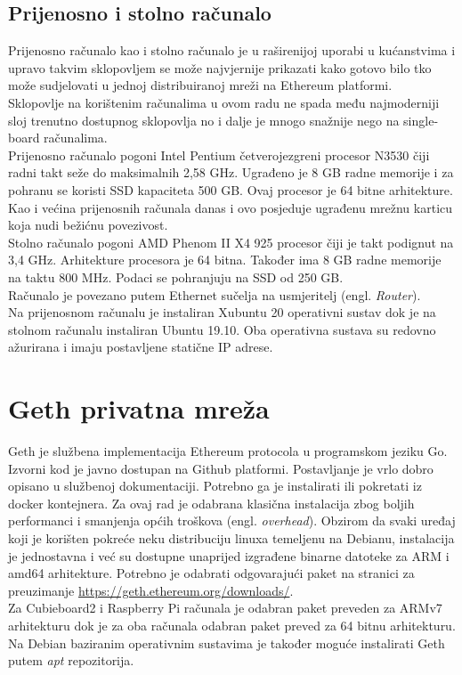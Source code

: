 \documentclass[times, utf8, zavrsni]{fer}
\begin{document}
\subsection{Prijenosno i stolno računalo}
Prijenosno računalo kao i stolno računalo je u raširenijoj uporabi u kućanstvima i upravo takvim sklopovljem se može
najvjernije prikazati kako gotovo bilo tko može sudjelovati u jednoj distribuiranoj mreži na Ethereum platformi. \\
Sklopovlje na korištenim računalima u ovom radu ne spada među najmoderniji sloj trenutno dostupnog sklopovlja no i dalje
je mnogo snažnije nego na single-board računalima. \\
Prijenosno računalo pogoni Intel Pentium četverojezgreni procesor N3530 čiji radni takt seže do maksimalnih 2,58 GHz.
Ugrađeno je 8 GB radne memorije i za pohranu se koristi SSD kapaciteta 500 GB. Ovaj procesor je 64 bitne arhitekture.
Kao i većina prijenosnih računala danas i ovo posjeduje ugrađenu mrežnu karticu koja nudi bežićnu povezivost. \\
Stolno računalo pogoni AMD Phenom II X4 925 procesor čiji je takt podignut na 3,4 GHz. Arhitekture procesora je 64 bitna.
Također ima 8 GB radne memorije na taktu 800 MHz. Podaci se pohranjuju na SSD od 250 GB. \\
Računalo je povezano putem Ethernet sučelja na usmjeritelj (engl. \emph{Router}). \\
Na prijenosnom računalu je instaliran Xubuntu 20 operativni sustav dok je na stolnom računalu instaliran Ubuntu 19.10.
Oba operativna sustava su redovno ažurirana i imaju postavljene statične IP adrese.
\section{Geth privatna mreža}
Geth je službena implementacija Ethereum protocola u programskom jeziku Go. Izvorni kod je javno dostupan na Github platformi. 
Postavljanje je vrlo dobro opisano u službenoj dokumentaciji. Potrebno ga je instalirati ili pokretati iz docker kontejnera. 
Za ovaj rad je odabrana klasična instalacija zbog boljih performanci i smanjenja općih troškova (engl. \emph{overhead}).
Obzirom da svaki uređaj koji je korišten pokreće neku distribuciju linuxa temeljenu na Debianu, instalacija je jednostavna
i već su dostupne unaprijed izgrađene binarne datoteke za ARM i amd64 arhitekture. Potrebno je odabrati odgovarajući paket na
stranici za preuzimanje \url{https://geth.ethereum.org/downloads/}.\\ Za Cubieboard2 i Raspberry Pi računala je odabran paket
preveden za ARMv7 arhitekturu dok je za oba računala odabran paket preved za 64 bitnu arhitekturu. \\
Na Debian baziranim operativnim sustavima je također moguće instalirati Geth putem \emph{apt} repozitorija. \\
\end{document}

